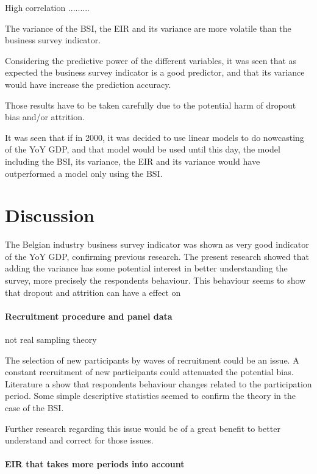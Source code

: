 \documentclass[12pt,a4paper,oneside]{book}
\begin{document}
High correlation .........

The variance of the BSI, the EIR and its variance are more volatile than the business survey indicator.

Considering the predictive power of the different variables, it was seen that as expected the business survey indicator is a good predictor, and that its variance would have increase the prediction accuracy.

Those results have to be taken carefully due to the potential harm of dropout bias and/or attrition.


It was seen that if in 2000, it was decided to use linear models to do nowcasting of the YoY GDP, and that model would be used until this day, the model including the BSI, its variance, the EIR and its variance would have outperformed a model only using the BSI.



\chapter{Discussion}

The Belgian industry business survey indicator was shown as very good indicator of the YoY GDP, confirming previous research.
The present research showed that adding the variance has some potential interest in better understanding the survey, more precisely the respondents behaviour. This behaviour seems to show that dropout and attrition can have a effect on 

\subsubsection{Recruitment procedure and panel data}

not real sampling theory

The selection of new participants by waves of recruitment could be an issue. A constant recruitment of new participants could attenuated the potential bias. Literature a show that respondents behaviour changes related to the participation period. Some simple descriptive statistics seemed to confirm the theory in the case of the BSI.

Further research regarding this issue would be of a great benefit to better understand and correct for those issues.



\subsubsection{EIR that takes more periods into account}
\end{document}

